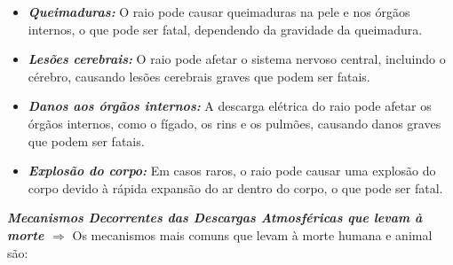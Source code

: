 \documentclass[a4paper, 12pt, onecolumn,singlespacing]{article}
\begin{document}
\begin{itemize}
\begin{itemize}
			\item \textbf{\textit{Queimaduras:}} O raio pode causar queimaduras na pele e nos órgãos internos, o que pode ser fatal, dependendo da gravidade da queimadura.
			
			\item \textbf{\textit{Lesões cerebrais:}} O raio pode afetar o sistema nervoso central, incluindo o cérebro, causando lesões cerebrais graves que podem ser fatais.
			
			\item \textbf{\textit{Danos aos órgãos internos:}} A descarga elétrica do raio pode afetar os órgãos internos, como o fígado, os rins e os pulmões, causando danos graves que podem ser fatais.
			
			\item \textbf{\textit{ Explosão do corpo:}} Em casos raros, o raio pode causar uma explosão do corpo devido à rápida expansão do ar dentro do corpo, o que pode ser fatal.
		\end{itemize}

		\subitem \textbf{\textit{Mecanismos Decorrentes das Descargas Atmosféricas que levam à morte $\Rightarrow$}} Os mecanismos mais comuns que levam à morte humana e animal são:
		

\end{itemize}
\end{document}
